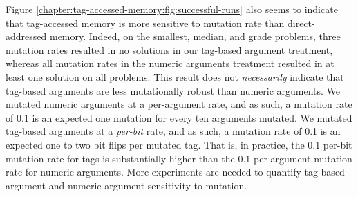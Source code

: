 Figure \ref{chapter:tag-accessed-memory:fig:successful-runs} also seems to indicate that tag-accessed memory is more sensitive to mutation rate than direct-addressed memory. 
Indeed, on the smallest, median, and grade problems, three mutation rates resulted in no solutions in our tag-based argument treatment, whereas all mutation rates in the numeric arguments treatment resulted in at least one solution on all problems.  
This result does not \textit{necessarily} indicate that tag-based arguments are less mutationally robust than numeric arguments.
We mutated numeric arguments at a per-argument rate, and as such, a mutation rate of 0.1 is an expected one mutation for every ten arguments mutated. 
We mutated tag-based arguments at a \textit{per-bit} rate, and as such, a mutation rate of 0.1 is an expected one to two bit flips per mutated tag. 
That is, in practice, the 0.1 per-bit mutation rate for tags is substantially higher than the 0.1 per-argument mutation rate for numeric arguments.
More experiments are needed to quantify tag-based argument and numeric argument sensitivity to mutation.  
